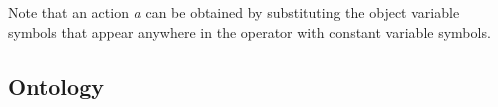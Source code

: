 \begin{itemize}
Note that an action \textit{a} can be obtained by substituting the object variable symbols that
appear anywhere in the operator with constant variable symbols.
%
%
%
%
%
%
\end{itemize}

\subsection{Ontology}
\label{subsect:Ontology}


